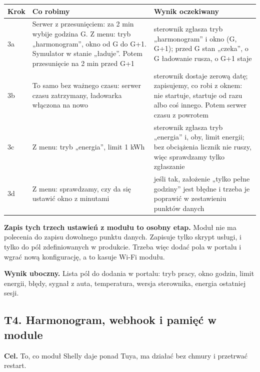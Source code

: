 \documentclass[11pt,a4paper]{article}
\begin{document}
\begin{longtable}{>{\raggedright\arraybackslash}p{3.00cm}>{\raggedright\arraybackslash}p{6.14cm}>{\raggedright\arraybackslash}p{6.14cm}}
\toprule
\rowcolor{apteallight}\textbf{Krok} & \textbf{Co robimy} & \textbf{Wynik oczekiwany} \\
\midrule\endhead
\bottomrule\endfoot
3a & Serwer z przesunięciem: za 2 min wybije godzina G. Z menu: tryb „harmonogram”, okno od G do G+1. Symulator w stanie „ładuje”. Potem przesunięcie na 2 min przed G+1 & sterownik zgłasza tryb „harmonogram” i okno (G, G+1); przed G stan „czeka”, o G ładowanie rusza, o G+1 staje \\
3b & To samo bez ważnego czasu: serwer czasu zatrzymany, ładowarka włączona na nowo & sterownik dostaje zerową datę; zapisujemy, co robi z oknem: nie startuje, startuje od razu albo coś innego. Potem serwer czasu z powrotem \\
3c & Z menu: tryb „energia”, limit 1 kWh & sterownik zgłasza tryb „energia” i, oby, limit energii; bez obciążenia licznik nie ruszy, więc sprawdzamy tylko zgłaszanie \\
3d & Z menu: sprawdzamy, czy da się ustawić okno z minutami & jeśli tak, założenie „tylko pełne godziny” jest błędne i trzeba je poprawić w zestawieniu punktów danych \\
\end{longtable}

\textbf{Zapis tych trzech ustawień z modułu to osobny etap.} Moduł nie ma polecenia do zapisu dowolnego punktu danych. Zapisuje tylko skrypt usługi, i tylko do pól zdefiniowanych w produkcie. Trzeba więc dodać pola w portalu i wgrać nową konfigurację, a to kasuje Wi-Fi modułu.


\textbf{Wynik uboczny.} Lista pól do dodania w portalu: tryb pracy, okno godzin, limit energii, błędy, sygnał z auta, temperatura, wersja sterownika, energia ostatniej sesji.


\subsection{T4. Harmonogram, webhook i pamięć w module}

\textbf{Cel.} To, co moduł Shelly daje ponad Tuya, ma działać bez chmury i przetrwać restart.
\end{document}
